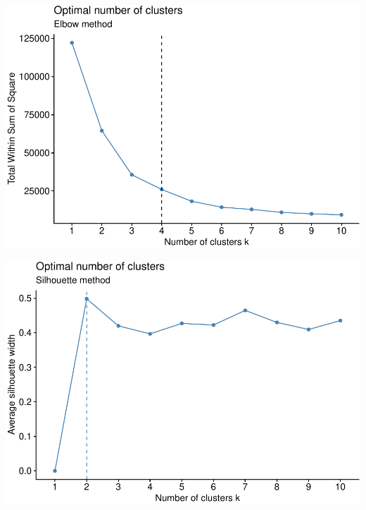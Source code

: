 \documentclass[12pt,twoside]{amherstthesis}
\begin{document}
  \begin{center}\includegraphics{Comps_Proj_files/figure-latex/unnamed-chunk-5-1} \end{center}
  
  \begin{Shaded}
  \begin{Highlighting}[]
   \NormalTok{) }\OperatorTok{+}
  \StringTok{  }\NormalTok{(} \NormalTok{)}
  \end{Highlighting}
  \end{Shaded}
  
  \begin{center}\includegraphics{Comps_Proj_files/figure-latex/unnamed-chunk-5-2} \end{center}
  
\end{document}
